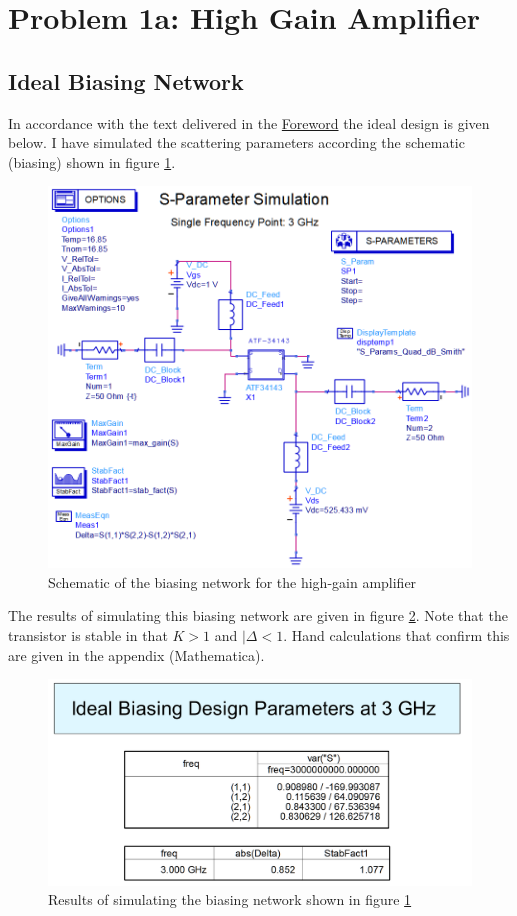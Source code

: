 \section{Problem 1a: High Gain Amplifier}
\label{sec:A2P1}

\subsection{Ideal Biasing Network}
In accordance with the text delivered in the \hyperref[sec:Foreword]{Foreword}
the ideal design is given below. I have simulated the scattering parameters
according the schematic (biasing) shown in figure
\ref{fig:A2P1IdealSchematic}.

\begin{figure}[H]
    \centering
    \includegraphics[width=0.8\linewidth]{Images/A2P1IdealSchematic.png}
    \caption{Schematic of the biasing network for the high-gain amplifier}
    \label{fig:A2P1IdealSchematic}
\end{figure}

The results of simulating this biasing network are given in figure
\ref{fig:A2P1IdealBiasingResults}. Note that the transistor is stable in that $K
>1$ and $|\Delta < 1$. Hand calculations that confirm this are given in the
appendix (Mathematica).

\begin{figure}[H]
    \centering
    \includegraphics[width=0.8\linewidth]{Images/A2P1IdealBiasingResults}
    \caption{Results of simulating the biasing network shown in figure
    \ref{fig:A2P1IdealSchematic}}
    \label{fig:A2P1IdealBiasingResults}
\end{figure}


